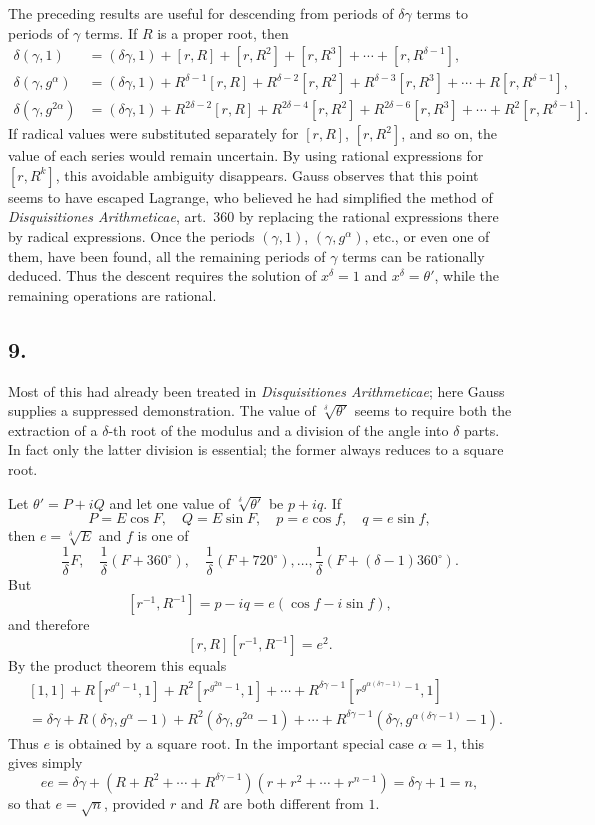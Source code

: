 \documentclass[12pt]{article}
\begin{document}
The preceding results are useful for descending from periods of $\delta\gamma$ terms to periods of $\gamma$ terms. If $R$ is a proper root, then
\[
\begin{aligned}
\delta(\gamma,1)&=(\delta\gamma,1)+[r,R]+[r,R^2]+[r,R^3]+\cdots+[r,R^{\delta-1}],\\
\delta(\gamma,g^\alpha)&=(\delta\gamma,1)+R^{\delta-1}[r,R]+R^{\delta-2}[r,R^2]+R^{\delta-3}[r,R^3]+\cdots+R[r,R^{\delta-1}],\\
\delta(\gamma,g^{2\alpha})&=(\delta\gamma,1)+R^{2\delta-2}[r,R]+R^{2\delta-4}[r,R^2]+R^{2\delta-6}[r,R^3]+\cdots+R^2[r,R^{\delta-1}].
\end{aligned}
\]
If radical values were substituted separately for $[r,R]$, $[r,R^2]$, and so on, the value of each series would remain uncertain. By using rational expressions for $[r,R^k]$, this avoidable ambiguity disappears. Gauss observes that this point seems to have escaped Lagrange, who believed he had simplified the method of \emph{Disquisitiones Arithmeticae}, art.~360 by replacing the rational expressions there by radical expressions. Once the periods $(\gamma,1)$, $(\gamma,g^\alpha)$, etc., or even one of them, have been found, all the remaining periods of $\gamma$ terms can be rationally deduced. Thus the descent requires the solution of $x^\delta=1$ and $x^\delta=\theta'$, while the remaining operations are rational.

\subsection*{9.}

Most of this had already been treated in \emph{Disquisitiones Arithmeticae}; here Gauss supplies a suppressed demonstration. The value of $\sqrt[\delta]{\theta'}$ seems to require both the extraction of a $\delta$-th root of the modulus and a division of the angle into $\delta$ parts. In fact only the latter division is essential; the former always reduces to a square root.

Let $\theta'=P+iQ$ and let one value of $\sqrt[\delta]{\theta'}$ be $p+iq$. If
\[
P=E\cos F,\quad Q=E\sin F,\quad p=e\cos f,\quad q=e\sin f,
\]
then $e=\sqrt[\delta]{E}$ and $f$ is one of
\[
\frac1\delta F,\quad \frac1\delta(F+360^\circ),\quad \frac1\delta(F+720^\circ),\ldots,
\frac1\delta(F+(\delta-1)360^\circ).
\]
But
\[
[r^{-1},R^{-1}]=p-iq=e(\cos f-i\sin f),
\]
and therefore
\[
[r,R][r^{-1},R^{-1}]=e^2.
\]
By the product theorem this equals
\[
\begin{aligned}
&[1,1]+R[r^{g^\alpha-1},1]+R^2[r^{g^{2\alpha}-1},1]+\cdots+
R^{\delta\gamma-1}[r^{g^{\alpha(\delta\gamma-1)}-1},1]\\
&=\delta\gamma+R(\delta\gamma,g^\alpha-1)+R^2(\delta\gamma,g^{2\alpha}-1)+\cdots+
R^{\delta\gamma-1}(\delta\gamma,g^{\alpha(\delta\gamma-1)}-1).
\end{aligned}
\]
Thus $e$ is obtained by a square root. In the important special case $\alpha=1$, this gives simply
\[
ee=\delta\gamma+(R+R^2+\cdots+R^{\delta\gamma-1})(r+r^2+\cdots+r^{n-1})
=\delta\gamma+1=n,
\]
so that $e=\sqrt n$, provided $r$ and $R$ are both different from $1$.
\end{document}

